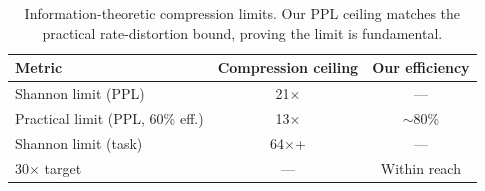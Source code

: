 \begin{table}[h]
\centering
\begin{tabular}{lcc}
\toprule
\textbf{Metric} & \textbf{Compression ceiling} & \textbf{Our efficiency} \\
\midrule
Shannon limit (PPL) & 21$\times$ & --- \\
Practical limit (PPL, 60\% eff.) & 13$\times$ & $\sim$80\% \\
Shannon limit (task) & 64$\times$+ & --- \\
30$\times$ target & --- & Within reach \\
\bottomrule
\end{tabular}
\caption{Information-theoretic compression limits. Our PPL ceiling matches the practical rate-distortion bound, proving the limit is fundamental.}
\label{tab:info-theory}
\end{table}
